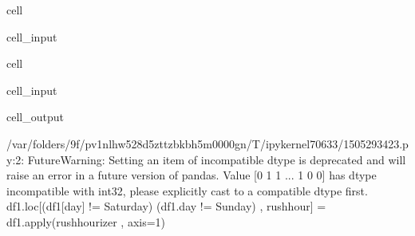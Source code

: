 \documentclass[letterpaper,10pt,english]{sphinxmanual}
\begin{document}
\begin{sphinxuseclass}{cell}
\begin{sphinxuseclass}{cell_input}
\begin{sphinxVerbatim}[commandchars=\\\{\}]
 
       \PYG{p}{[}\PYG{p}{]}  
          
       \PYG{p}{[}\PYG{p}{]}  
          
          
     
\end{sphinxVerbatim}

\end{sphinxuseclass}
\end{sphinxuseclass}
\begin{sphinxuseclass}{cell}
\begin{sphinxuseclass}{cell_input}
\begin{sphinxVerbatim}[commandchars=\\\{\}]
\PYG{p}{[}\PYG{p}{[}\PYG{p}{]}        \PYG{p}{]}    
\end{sphinxVerbatim}

\end{sphinxuseclass}
\begin{sphinxuseclass}{cell_output}
\begin{sphinxVerbatim}[commandchars=\\\{\}]
/var/folders/9f/pv1nlhw528d\PYGZus{}5zttzbkb\PYGZus{}h5m0000gn/T/ipykernel\PYGZus{}70633/1505293423.py:2: FutureWarning: Setting an item of incompatible dtype is deprecated and will raise an error in a future version of pandas. Value \PYGZsq{}[0 1 1 ... 1 0 0]\PYGZsq{} has dtype incompatible with int32, please explicitly cast to a compatible dtype first.
  df1.loc[(df1[\PYGZsq{}day\PYGZsq{}] != \PYGZsq{}Saturday\PYGZsq{}) \PYGZam{} (df1.day != \PYGZsq{}Sunday\PYGZsq{}) , \PYGZsq{}rush\PYGZus{}hour\PYGZsq{}] = df1.apply(rush\PYGZus{}hourizer , axis=1)
\end{sphinxVerbatim}

\end{sphinxuseclass}
\end{sphinxuseclass}
\end{document}
